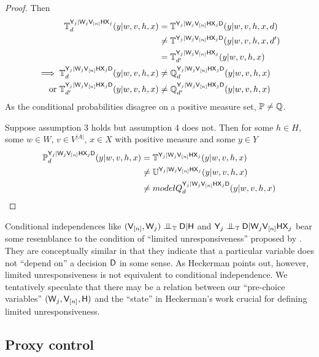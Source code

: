 \begin{proof}
Then
\begin{align}
    \mathbb{T}_d^{\mathsf{Y}_j|\mathsf{W}_j\mathsf{V}_{[n]}\mathsf{HX}_j}(y|w,v,h,x)&= \mathbb{T}^{\mathsf{Y}_j|\mathsf{W}_j\mathsf{V}_{[n]}\mathsf{HX}_j\mathsf{D}}(y|w,v,h,x,d)\\
    &\neq \mathbb{T}^{\mathsf{Y}_j|\mathsf{W}_j\mathsf{V}_{[n]}\mathsf{HX}_j\mathsf{D}}(y|w,v,h,x,d')\\
    &= \mathbb{T}_{d'}^{\mathsf{Y}_j|\mathsf{W}_j\mathsf{V}_{[n]}\mathsf{HX}_j}(y|w,v,h,x)\\
    \implies \mathbb{T}_d^{\mathsf{Y}_j|\mathsf{W}_j\mathsf{V}_{[n]}\mathsf{HX}_j\mathsf{D}}(y|w,v,h,x) &\neq \mathbb{Q}_d^{\mathsf{Y}_j|\mathsf{W}_j\mathsf{V}_{[n]}\mathsf{HX}_j\mathsf{D}}(y|w,v,h,x)\\
    \text{or } \mathbb{T}_{d'}^{\mathsf{Y}_j|\mathsf{W}_j\mathsf{V}_{[n]}\mathsf{HX}_j\mathsf{D}}(y|w,v,h,x) &\neq \mathbb{Q}_{d'}^{\mathsf{Y}_j|\mathsf{W}_j\mathsf{V}_{[n]}\mathsf{HX}_j\mathsf{D}}(y|w,v,h,x)
\end{align}
As the conditional probabilities disagree on a positive measure set, $\mathbb{P}\neq\mathbb{Q}$.

Suppose assumption 3 holds but assumption 4 does not. Then for some $h\in H$, some $w\in W$, $v\in V^{|A|}$, $x\in X$ with positive measure and some $y\in Y$
\begin{align}
    \mathbb{P}_d^{\mathsf{Y}_j|\mathsf{W}_j\mathsf{V}_{[n]}\mathsf{HX}_j\mathsf{D}}(y|w,v,h,x)&= \mathbb{T}^{\mathsf{Y}_j|\mathsf{W}_j\mathsf{V}_{[n]}\mathsf{HX}_j}(y|w,v,h,x)\\
    &\neq \mathbb{U}^{\mathsf{Y}_j|\mathsf{W}_j\mathsf{V}_{[n]}\mathsf{HX}_j}(y|w,v,h,x)\\
    &\neq model{Q}_d^{\mathsf{Y}_j|\mathsf{W}_j\mathsf{V}_{[n]}\mathsf{HX}_j\mathsf{D}}(y|w,v,h,x)
\end{align}
\end{proof}

Conditional independences like $(\RV{V}_{[n]},\RV{W}_j)\CI_{\model{T}} \RV{D}|\RV{H}$ and $\RV{Y}_j\CI_{\model{T}}\RV{D}|\RV{W}_j\RV{V}_{[n]}\RV{HX}_j$ bear some resemblance to the condition of ``limited unresponsiveness'' proposed by \citet{heckerman_decision-theoretic_1995}. They are conceptually similar in that they indicate that a particular variable does not ``depend on'' a decision $\mathsf{D}$ in some sense. As Heckerman points out, however, limited unresponsiveness is not equivalent to conditional independence. We tentatively speculate that there may be a relation between our ``pre-choice variables'' $(\mathsf{W}_j,\mathsf{V}_{[n]},\mathsf{H})$ and the ``state'' in Heckerman's work crucial for defining limited unresponsiveness.

\subsection{Proxy control}

